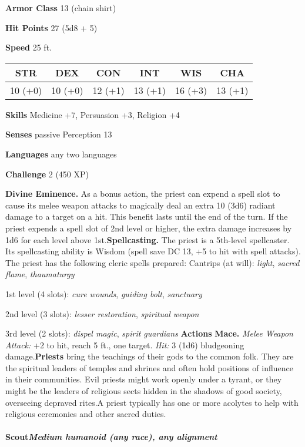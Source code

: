 \documentclass[
]{article}
\begin{document}
\textbf{Armor Class} 13 (chain shirt)

\textbf{Hit Points} 27 (5d8 + 5)

\textbf{Speed} 25 ft.

\begin{longtable}[]{@{}cccccc@{}}
\toprule
STR & DEX & CON & INT & WIS & CHA\tabularnewline
\midrule
\endhead
10 (+0) & 10 (+0) & 12 (+1) & 13 (+1) & 16 (+3) & 13 (+1)\tabularnewline
\bottomrule
\end{longtable}

\textbf{Skills} Medicine +7, Persuasion +3, Religion +4

\textbf{Senses} passive Perception 13

\textbf{Languages} any two languages

\textbf{Challenge} 2 (450 XP)

\textbf{Divine Eminence.} As a bonus action, the priest can expend a
spell slot to cause its melee weapon attacks to magically deal an extra
10 (3d6) radiant damage to a target on a hit. This benefit lasts until
the end of the turn. If the priest expends a spell slot of 2nd level or
higher, the extra damage increases by 1d6 for each level above
1st.\textbf{Spellcasting.} The priest is a 5th-level spellcaster. Its
spellcasting ability is Wisdom (spell save DC 13, +5 to hit with spell
attacks). The priest has the following cleric spells prepared: Cantrips
(at will): \emph{light}, \emph{sacred flame}, \emph{thaumaturgy}

1st level (4 slots): \emph{cure wounds}, \emph{guiding bolt},
\emph{sanctuary}

2nd level (3 slots): \emph{lesser restoration}, \emph{spiritual weapon}

3rd level (2 slots): \emph{dispel magic}, \emph{spirit guardians}
\textbf{Actions} \textbf{Mace.} \emph{Melee Weapon Attack:} +2 to hit,
reach 5 ft., one target. \emph{Hit:} 3 (1d6) bludgeoning
damage.\textbf{Priests} bring the teachings of their gods to the common
folk. They are the spiritual leaders of temples and shrines and often
hold positions of influence in their communities. Evil priests might
work openly under a tyrant, or they might be the leaders of religious
sects hidden in the shadows of good society, overseeing depraved rites.A
priest typically has one or more acolytes to help with religious
ceremonies and other sacred duties.

\hypertarget{scoutmedium-humanoid-any-race-any-alignment}{%
\paragraph{\texorpdfstring{Scout\emph{Medium humanoid (any race), any
alignment}}{ScoutMedium humanoid (any race), any alignment}}\label{scoutmedium-humanoid-any-race-any-alignment}}
\end{document}
